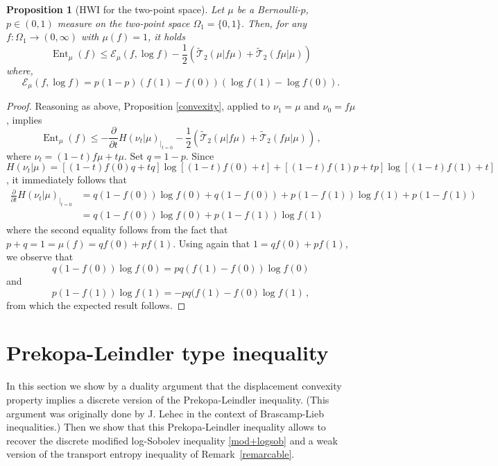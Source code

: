 \documentclass[11pt]{amsart}
\newtheorem{prop}[equation]{Proposition}
\numberwithin{equation}{section}
\begin{document}
\begin{prop}[HWI for the two-point space]\label{hwitwopoints}
Let $\mu$ be a Bernoulli-$p$, $p \in (0,1)$ measure on the two-point space $\Omega_1=\{0,1\}$. Then, for any 
$f \colon \Omega_1 \to (0,\infty)$ with $\mu(f)=1$, it holds
$$
{\operatorname{Ent}}_\mu(f) \leq \mathcal{E}_\mu(f,\log f) - \frac{1}{2}\left( {\widetilde{\mathcal{T}}}_2 (\mu|f \mu) + {\widetilde{\mathcal{T}}}_2 (f \mu|\mu) \right)
$$
where,  
$$
\mathcal{E}_\mu(f,\log f) = p(1-p)(f(1)-f(0))(\log f(1) - \log f(0)) .
$$
\end{prop}

\begin{proof} Reasoning as above, 
 Proposition \ref{convexity}, applied to $\nu_1 = \mu$ and $\nu_0= f\mu$, implies
$$
{\operatorname{Ent}}_\mu (f) \leq - \frac{\partial}{\partial t} H(\nu_t  | \mu)_{|_{t=0}} - \frac{1}{2}\left( {\widetilde{\mathcal{T}}}_2 (\mu|f \mu) + {\widetilde{\mathcal{T}}}_2 (f \mu|\mu) \right) \,,
$$
where $\nu_t = (1-t)f\mu + t \mu$. Set $q=1-p$. 
Since $H(\nu_t |\mu) = [(1-t)f(0)q + t q] \log [(1-t)f(0)+t] + 
[(1-t)f(1)p + t p] \log [(1-t)f(1)+t]$, it immediately follows that
\begin{align*}
\frac{\partial}{\partial t} H(\nu_t  | \mu)_{|_{t=0}} 
& = 
q(1-f(0))\log f(0) + q(1-f(0)) 
+ p(1-f(1))\log f(1) + p(1-f(1)) \\
& =
q(1-f(0))\log f(0)  + p(1-f(1))\log f(1)
\end{align*}
where the second equality follows from the fact that $p+q=1=\mu(f)=qf(0)+pf(1)$.
Using again that $1=qf(0)+pf(1)$, we observe that
$$
q(1-f(0))\log f(0) = pq(f(1) - f(0))\log f(0) 
$$
and
$$
p(1-f(1))\log f(1) = -pq(f(1)-f(0) \log f(1)\,,
$$
from which the expected result follows.
\end{proof}

\section{Prekopa-Leindler type inequality}

In this section we show by a duality argument that the displacement convexity property implies a discrete version of the Prekopa-Leindler inequality.  (This argument was originally done by J. Lehec \cite{lehec12} in the context of Brascamp-Lieb inequalities.) Then we show that this Prekopa-Leindler inequality allows to recover the discrete  modified  log-Sobolev inequality \eqref{mod+logsob} and a weak version of the transport entropy inequality of Remark~\ref{remarcable}.
\end{document}
